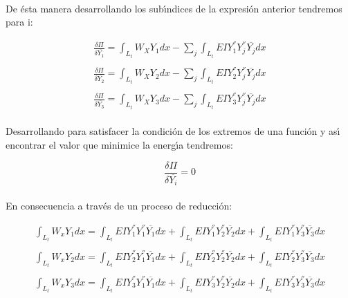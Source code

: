 \documentclass[letterpaper,oneside,12pt]{report}
\begin{document}
\paragraph{} De \'esta manera desarrollando los sub\'{\i}ndices de la expresi\'on anterior tendremos para i:

$$\begin{array}{c}
\frac{\delta\Pi}{\delta\overline{Y_{1}}}=\int_{L_{t}}{W_{X}Y_{1}dx}-\sum_{j}\int_{L_{t}}{EIY_{1}^{''}Y_{j}^{''}\overline{Y_{j}}dx }
\\\\
\frac{\delta\Pi}{\delta\overline{Y_{2}}}=\int_{L_{t}}{W_{X}Y_{2}dx}-\sum_{j}\int_{L_{t}}{EIY_{2}^{''}Y_{j}^{''}\overline{Y_{j}}dx }
\\\\
\frac{\delta\Pi}{\delta\overline{Y_{3}}}=\int_{L_{t}}{W_{X}Y_{3}dx}-\sum_{j}\int_{L_{t}}{EIY_{3}^{''}Y_{j}^{''}\overline{Y_{j}}dx }
\end{array}$$

\paragraph{} Desarrollando para satisfacer la condici\'on de los extremos de una funci\'on y as\'{\i} encontrar el valor que minimice la energ\'{\i}a tendremos:

$$\frac{\delta\Pi}{\delta\overline{Y_{i}}}=0$$

\paragraph{} En consecuencia a trav\'es de un proceso de reducci\'on:

$$\begin{array}{c}
\int_{L_{t}}{W_{x}Y_{1}dx}=\int_{L_{t}}{EIY_{1}^{''}Y_{1}^{''}\overline{Y_{1}}dx}+\int_{L_{t}}{EIY_{1}^{''}Y_{2}^{''}\overline{Y_{2}}dx}+\int_{L_{t}}{EIY_{1}^{''}Y_{3}^{''}\overline{Y_{3}}dx}
\\\\
\int_{L_{t}}{W_{x}Y_{2}dx}=\int_{L_{t}}{EIY_{2}^{''}Y_{1}^{''}\overline{Y_{1}}dx}+\int_{L_{t}}{EIY_{2}^{''}Y_{2}^{''}\overline{Y_{2}}dx}+\int_{L_{t}}{EIY_{2}^{''}Y_{3}^{''}\overline{Y_{3}}dx}
\\\\
\int_{L_{t}}{W_{x}Y_{3}dx}=\int_{L_{t}}{EIY_{3}^{''}Y_{1}^{''}\overline{Y_{1}}dx}+\int_{L_{t}}{EIY_{3}^{''}Y_{2}^{''}\overline{Y_{2}}dx}+\int_{L_{t}}{EIY_{3}^{''}Y_{3}^{''}\overline{Y_{3}}dx}
\end{array}$$
\end{document}
